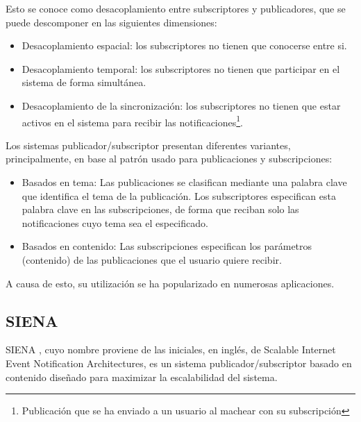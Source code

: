 Esto se conoce como desacoplamiento entre subscriptores y publicadores, que se
puede descomponer en las siguientes dimensiones\cite{}:
\begin{itemize}

    \item Desacoplamiento espacial: los subscriptores no tienen que conocerse 
    entre si.
    
    \item Desacoplamiento temporal: los subscriptores no tienen que participar
    en el sistema de forma simultánea.

    \item Desacoplamiento de la sincronización: los subscriptores no tienen que estar 
    activos en el sistema para recibir las 
    notificaciones\footnote{Publicación que se ha enviado a un usuario al machear con su 
    subscripción\cite{paper:themanyfacesofpubsub}}.
    
\end{itemize}

Los sistemas publicador/subscriptor presentan diferentes variantes, principalmente, en base
al patrón usado para publicaciones y subscripciones\cite{tfm:victor2017}:
\begin{itemize}
    
    \item Basados en tema: Las publicaciones se clasifican mediante una palabra
    clave que identifica el tema de la publicación. Los subscriptores especifican
    esta palabra clave en las subscripciones, de forma que reciban solo las
    notificaciones cuyo tema sea el especificado.
    
    \item Basados en contenido: Las subscripciones especifican los parámetros
    (contenido) de las publicaciones que el usuario quiere recibir.
    
\end{itemize}

A causa de esto, su utilización se ha popularizado en numerosas 
aplicaciones\cite{paper:themanyfacesofpubsub}.


\subsection{SIENA} \label{ssct:art_sistpubsubcont_siena}

SIENA \cite{paper:siena}, cuyo nombre proviene de las iniciales, en inglés, de Scalable Internet 
Event Notification Architectures, es un sistema publicador/subscriptor basado en contenido 
diseñado para maximizar la escalabilidad del sistema. 

